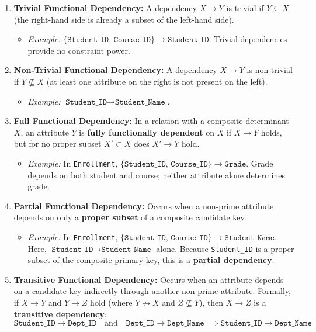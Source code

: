 \begin{enumerate}
\item \textbf{Trivial Functional Dependency:}
A dependency $X \rightarrow Y$ is trivial if $Y \subseteq X$ (the right-hand side is already a subset of the left-hand side).
\begin{itemize}
\item \textit{Example:} $\{\texttt{Student\_ID, Course\_ID}\} \rightarrow \texttt{Student\_ID}$. Trivial dependencies provide no constraint power.
\end{itemize}

\item \textbf{Non-Trivial Functional Dependency:}
A dependency $X \rightarrow Y$ is non-trivial if $Y \not\subseteq X$ (at least one attribute on the right is not present on the left).
\begin{itemize}
\item \textit{Example:} $\texttt{Student\_ID} \rightarrow \texttt{Student\_Name}$.
\end{itemize}

\item \textbf{Full Functional Dependency:}
In a relation with a composite determinant $X$, an attribute $Y$ is \textbf{fully functionally dependent} on $X$ if $X \rightarrow Y$ holds, but for no proper subset $X' \subset X$ does $X' \rightarrow Y$ hold.
\begin{itemize}
\item \textit{Example:} In \texttt{Enrollment}, $\{\texttt{Student\_ID, Course\_ID}\} \rightarrow \texttt{Grade}$. Grade depends on both student and course; neither attribute alone determines grade.
\end{itemize}

\item \textbf{Partial Functional Dependency:}
Occurs when a non-prime attribute depends on only a \textbf{proper subset} of a composite candidate key.
\begin{itemize}
\item \textit{Example:} In \texttt{Enrollment}, $\{\texttt{Student\_ID, Course\_ID}\} \rightarrow \texttt{Student\_Name}$. Here, $\texttt{Student\_ID} \rightarrow \texttt{Student\_Name}$ alone. Because \texttt{Student\_ID} is a proper subset of the composite primary key, this is a \textbf{partial dependency}.
\end{itemize}

\item \textbf{Transitive Functional Dependency:}
Occurs when an attribute depends on a candidate key indirectly through another non-prime attribute. Formally, if $X \rightarrow Y$ and $Y \rightarrow Z$ hold (where $Y \not\rightarrow X$ and $Z \not\subseteq Y$), then $X \rightarrow Z$ is a \textbf{transitive dependency}:
\[ \texttt{Student\_ID} \rightarrow \texttt{Dept\_ID} \quad \text{and} \quad \texttt{Dept\_ID} \rightarrow \texttt{Dept\_Name} \implies \texttt{Student\_ID} \rightarrow \texttt{Dept\_Name} \]
\end{enumerate}


